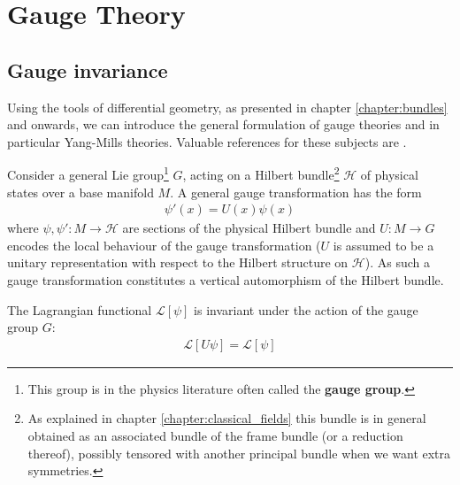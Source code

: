 \chapter{Gauge Theory}

\section{Gauge invariance}

	Using the tools of differential geometry, as presented in chapter \ref{chapter:bundles} and onwards, we can introduce the general formulation of gauge theories and in particular Yang-Mills theories. Valuable references for these subjects are \cite{principal_bundles,sen_nash,schuller,gauge1}.

	Consider a general Lie group\footnote{This group is in the physics literature often called the \textbf{gauge group}.} $G$, acting on a Hilbert bundle\footnote{As explained in chapter \ref{chapter:classical_fields} this bundle is in general obtained as an associated bundle of the frame bundle (or a reduction thereof), possibly tensored with another principal bundle when we want extra symmetries.} $\mathcal{H}$ of physical states over a base manifold $M$. A general gauge transformation has the form
	\begin{gather}
		\label{qft:gauge_transformation}
		\psi'(x) = U(x)\psi(x)
	\end{gather}
	where $\psi, \psi':M\rightarrow\mathcal{H}$ are sections of the physical Hilbert bundle and $U:M\rightarrow G$ encodes the local behaviour of the gauge transformation ($U$ is assumed to be a unitary representation with respect to the Hilbert structure on $\mathcal{H}$). As such a gauge transformation constitutes a vertical automorphism of the Hilbert bundle.

	\begin{axiom}
		The Lagrangian functional $\mathcal{L}[\psi]$ is invariant under the action of the gauge group $G$:
		\begin{gather}
			\mathcal{L}[U\psi] = \mathcal{L}[\psi]
		\end{gather}
	\end{axiom}

